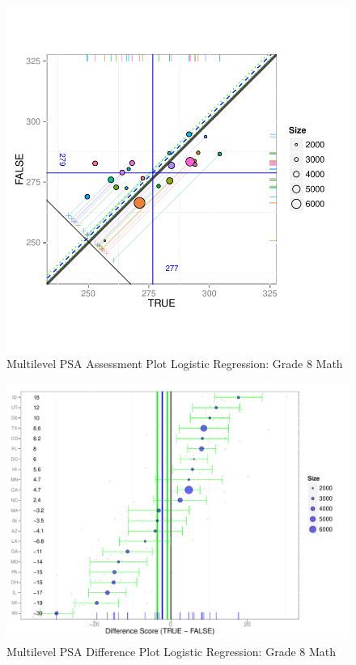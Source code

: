 \begin{figure}[h!]
\begin{center}
\includegraphics[width=\textwidth]{../Figures2009/g8math-mlpsa-lr-circ.pdf}
\caption{Multilevel PSA Assessment Plot Logistic Regression: Grade 8 Math}
\end{center}
\end{figure}

\begin{figure}[h!]
\begin{center}
\includegraphics[width=\textwidth]{../Figures2009/g8math-mlpsa-lr-diff.pdf}
\caption{Multilevel PSA Difference Plot Logistic Regression: Grade 8 Math}
\end{center}
\end{figure}

